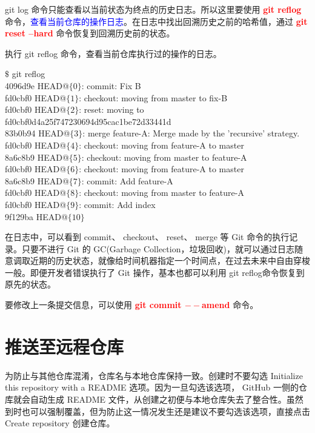 \documentclass[12pt,a4paper]{article}
\begin{document}
git log 命令只能查看以当前状态为终点的历史日志。所以这里要使用 \textcolor{red}{\bf git reflog} 命令，\textcolor{blue}{查看当前仓库的操作日志}。在日志中找出回溯历史之前的哈希值，通过 \textcolor{red}{\bf git reset --hard} 命令恢复到回溯历史前的状态。

执行 git reflog 命令，查看当前仓库执行过的操作的日志。
\begin{tcolorbox}[colback=green!5,colframe=green!40!black,title= ]
$\$$ git reflog \\
4096d9e HEAD@$\{0\}$: commit: Fix B \\
fd0cbf0 HEAD@$\{1\}$: checkout: moving from master to fix-B \\
fd0cbf0 HEAD@$\{2\}$: reset: moving to fd0cbf0d4a25f747230694d95cac1be72d33441d \\
83b0b94 HEAD@$\{3\}$: merge feature-A: Merge made by the 'recursive' strategy. \\
fd0cbf0 HEAD@$\{4\}$: checkout: moving from feature-A to master \\
8a6c8b9 HEAD@$\{5\}$: checkout: moving from master to feature-A \\
fd0cbf0 HEAD@$\{6\}$: checkout: moving from feature-A to master \\
8a6c8b9 HEAD@$\{7\}$: commit: Add feature-A \\
fd0cbf0 HEAD@$\{8\}$: checkout: moving from master to feature-A \\
fd0cbf0 HEAD@$\{9\}$: commit: Add index \\
9f129ba HEAD@$\{10\}$
\end{tcolorbox}

在日志中，可以看到 commit、 checkout、 reset、 merge 等 Git 命令的执行记录。只要不进行 Git 的 GC(Garbage Collection，垃圾回收)，就可以通过日志随意调取近期的历史状态，就像给时间机器指定一个时间点，在过去未来中自由穿梭一般。即便开发者错误执行了 Git 操作，基本也都可以利用 git reflog命令恢复到原先的状态。


要修改上一条提交信息，可以使用 \textcolor{red}{\bf git commit $--$amend} 命令。


\section{推送至远程仓库}
为防止与其他仓库混淆，仓库名与本地仓库保持一致。创建时不要勾选 Initialize this repository with a README 选项。因为一旦勾选该选项， GitHub 一侧的仓库就会自动生成 README 文件，从创建之初便与本地仓库失去了整合性。虽然到时也可以强制覆盖，但为防止这一情况发生还是建议不要勾选该选项，直接点击 Create repository 创建仓库。
\end{document}
